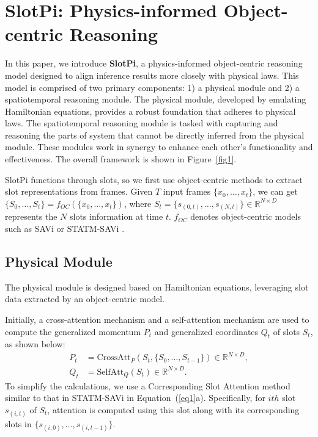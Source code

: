 \documentclass[sigconf]{acmart}
\begin{document}
\section{SlotPi: Physics-informed Object-centric Reasoning}

In this paper, we introduce \textbf{SlotPi}, a physics-informed object-centric reasoning model designed to align inference results more closely with physical laws. This model is comprised of two primary components: 1) a physical module and 2) a spatiotemporal reasoning module. The physical module, developed by emulating Hamiltonian equations, provides a robust foundation that adheres to physical laws. The spatiotemporal reasoning module is tasked with capturing and reasoning the parts of system that cannot be directly inferred from the physical module. These modules work in synergy to enhance each other's functionality and effectiveness. The overall framework is shown in Figure~\ref{fig1}.

SlotPi functions through slots, so we first use object-centric methods to extract slot representations from frames. Given $T$ input frames $\{x_0, \dots, x_t\}$, we can get $\{S_0, \dots, S_t\} = f_{OC}(\{x_0, \dots, x_t\})$, where $S_t= \{s_{(0,t)}, \dots, s_{(N,t)}\} \in \mathbb{R}^{N \times D}$ represents the $N$ slots information at time $t$. $f_{OC}$ denotes object-centric models such as SAVi \cite{kipf2021conditional} or STATM-SAVi \cite{li2024reasoningenhanced}.

\subsection{Physical Module}

The physical module is designed based on Hamiltonian equations, leveraging slot data extracted by an object-centric model. 

Initially, a cross-attention mechanism and a self-attention mechanism are used to compute the generalized momentum $P_t$ and generalized coordinates $Q_t$ of slots $S_t$, as shown below:
\begin{subequations}
\label{eq1}
\begin{align}
P_t &= \mathrm{CrossAtt}_P (S_t,\{S_0, \dots, S_{t-1}\}) \in \mathbb{R}^{N \times D}, \\
Q_t &= \mathrm{SelfAtt}_Q (S_t) \in \mathbb{R}^{N \times D} .
\end{align}
\end{subequations}
To simplify the calculations, we use a Corresponding Slot Attention method similar to that in STATM-SAVi \cite{li2024reasoningenhanced} in Equation~(\ref{eq1}a). Specifically, for $ith$ slot $s_{(i,t)}$ of $S_t$, attention is computed using this slot along with its corresponding slots in $\{s_{(i,0)}, \dots, s_{(i,t-1)}\}$.
\end{document}
